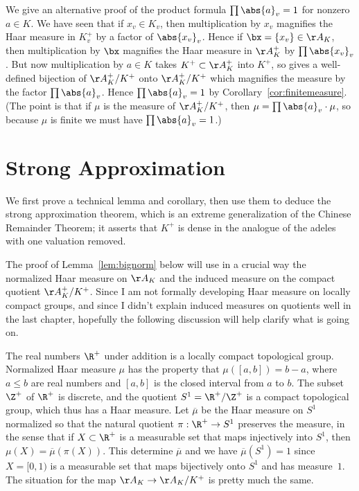 \documentclass[11pt]{book}
\begin{document}
\begin{ch}
\begin{remark}\label{rem:conceptual_prod}
  We give an alternative proof of the product formula
  $\prod\abs{a}_v=1$ for nonzero $a\in K$.  We have seen that if
  $x_v\in K_v$, then multiplication by $x_v$ magnifies the Haar
  measure in $K_v^+$ by a factor of $\abs{x_v}_v$.  Hence if
  $\bx=\{x_v\}\in\AA_K$, then multiplication by $\bx$ magnifies the
  Haar measure in $\AA_K^+$ by $\prod \abs{x_v}_v$.  But now
  multiplication by $a\in K$ takes $K^+\subset \AA_K^+$ into $K^+$, so
  gives a well-defined bijection of $\AA_K^+/K^+$ onto $\AA_K^+/K^+$
  which magnifies the measure by the factor $\prod\abs{a}_v$.  Hence
  $\prod\abs{a}_v=1$ by Corollary~\ref{cor:finitemeasure}.  (The point is
  that if $\mu$ is the measure of $\AA_K^+/K^+$, then $\mu =
  \prod\abs{a}_v \cdot \mu$, so because $\mu$ is finite we must have
  $\prod\abs{a}_v = 1$.)
\end{remark}


\section{Strong Approximation}
We first prove a technical lemma and corollary, then use them to
deduce the strong approximation theorem, which is an extreme
generalization of the Chinese Remainder Theorem; it asserts that $K^+$
is dense in the analogue of the adeles with one valuation removed.

The proof of Lemma~\ref{lem:bignorm} below will use in a crucial way
the normalized Haar measure on $\AA_K$ and the induced measure on the
compact quotient $\AA_K^+/K^+$.  Since I am not formally developing
Haar measure on locally compact groups, and since I didn't explain
induced measures on quotients well in the last chapter, hopefully the
following discussion will help clarify what is going on.

The real numbers $\R^+$ under addition is a locally compact
topological group.  Normalized Haar measure $\mu$ has the property
that $\mu([a,b]) = b-a$, where $a\leq b$ are real numbers and
$[a,b]$ is the closed interval from $a$ to $b$.  The subset
$\Z^+$ of $\R^+$ is discrete, and the quotient $S^1 = \R^+/\Z^+$
is a compact topological group, which thus
has a Haar measure.  Let $\overline{\mu}$ be the Haar measure
on $S^1$ normalized so that  the natural quotient $\pi:\R^+\to S^1$
preserves the measure, in the sense that if $X\subset \R^+$
is a measurable set that maps injectively into $S^1$, then
$\mu(X) = \overline{\mu}(\pi(X))$.  This determine
$\overline{\mu}$ and we have $\overline{\mu}(S^1)=1$ since
$X=[0,1)$ is a measurable set that maps bijectively onto
$S^1$ and has measure~$1$.  The situation for the map
$\AA_K \to \AA_K/K^+$ is pretty much the same.



\end{ch}
\end{document}
